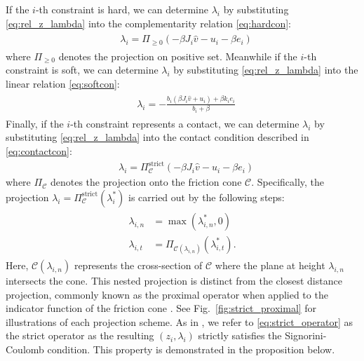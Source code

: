 \documentclass[lettersize,journal]{IEEEtran}
\begin{document}
If the $i$-th constraint is hard, we can determine $\lambda_i$ by substituting \eqref{eq:rel_z_lambda} into the complementarity relation \eqref{eq:hardcon}: 
\begin{align} \label{eq:closedform_hard}
\begin{split}
    &\lambda_i = \Pi_{\ge 0}\left (-\beta J_i\hat{v}-u_i-\beta e_i \right) 
\end{split}
\end{align}
where $\Pi_{\ge 0}$ denotes the projection on positive set.
Meanwhile if the $i$-th constraint is soft, we can determine $\lambda_i$ by substituting \eqref{eq:rel_z_lambda} into the linear relation \eqref{eq:softcon}: 
\begin{align} \label{eq:closedform_soft}
\begin{split}
    &\lambda_i = -\frac{b_i(\beta J_i\hat{v}+u_i) + \beta k_i e_i}{b_i+\beta}
\end{split}
\end{align}
Finally, if the $i$-th constraint represents a contact, we can determine $\lambda_i$ by substituting \eqref{eq:rel_z_lambda} into the contact condition described in \eqref{eq:contactcon}:
\begin{align} \label{eq:closedform_contact}
&\lambda_i = \Pi_{\mathcal{C}}^\text{strict} \left(-\beta J_i\hat{v}-u_i-\beta e_i \right)
\end{align}
where $\Pi_{\mathcal{C}}$ denotes the projection onto the friction cone $\mathcal{C}$. 
Specifically, the projection $\lambda_i = \Pi_{\mathcal{C}}^\text{strict}\left(\lambda_i^*\right)$ is carried out by the following steps:
\begin{align} \label{eq:strict_operator}
\begin{split}
    \lambda_{i,n} &= \max(\lambda_{i,n}^{*},0) \\ 
    \lambda_{i,t} &= \Pi_{\mathcal{C}(\lambda_{i,n})}(\lambda_{i,t}^{*}). 
\end{split}
\end{align}
Here, $\mathcal{C}(\lambda_{i,n})$ represents the cross-section of $\mathcal{C}$ where the plane at height $\lambda_{i,n}$ intersects the cone.
This nested projection is distinct from the closest distance projection, commonly known as the proximal operator when applied to the indicator function of the friction cone \cite{parikh2014proximal}. 
See Fig.~\ref{fig:strict_proximal} for illustrations of each projection scheme.
As in \cite{lee2022large}, we refer to \eqref{eq:strict_operator} as the strict operator as the resulting $(z_i,\lambda_i)$ strictly satisfies the Signorini-Coulomb condition. This property is demonstrated in the proposition below.
\end{document}

